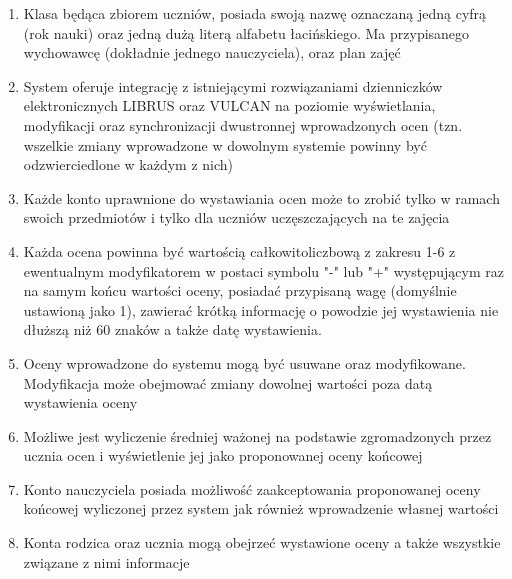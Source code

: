 \documentclass{article}
\begin{document}
\begin{enumerate}
    \item Klasa będąca zbiorem uczniów, posiada swoją nazwę oznaczaną jedną cyfrą (rok nauki) oraz jedną dużą literą alfabetu łacińskiego. Ma przypisanego wychowawcę (dokładnie jednego nauczyciela), oraz plan zajęć
    \item System oferuje integrację z istniejącymi rozwiązaniami dzienniczków elektronicznych LIBRUS oraz VULCAN na poziomie wyświetlania, modyfikacji oraz synchronizacji dwustronnej wprowadzonych ocen (tzn. wszelkie zmiany wprowadzone w dowolnym systemie powinny być odzwierciedlone w każdym z nich)
    \item Każde konto uprawnione do wystawiania ocen może to zrobić tylko w ramach swoich przedmiotów i tylko dla uczniów uczęszczających na te zajęcia
    \item Każda ocena powinna być wartością całkowitoliczbową z zakresu 1-6 z ewentualnym modyfikatorem w postaci symbolu "-" lub "+" występującym raz na samym końcu wartości oceny, posiadać przypisaną wagę (domyślnie ustawioną jako 1), zawierać krótką informację o powodzie jej wystawienia nie dłuższą niż 60 znaków a także datę wystawienia.
    \item Oceny wprowadzone do systemu mogą być usuwane oraz modyfikowane. Modyfikacja może obejmować zmiany dowolnej wartości poza datą wystawienia oceny
    \item Możliwe jest wyliczenie średniej ważonej na podstawie zgromadzonych przez ucznia ocen i wyświetlenie jej jako proponowanej oceny końcowej
    \item Konto nauczyciela posiada możliwość zaakceptowania proponowanej oceny końcowej wyliczonej przez system jak również wprowadzenie własnej wartości
    \item Konta rodzica oraz ucznia mogą obejrzeć wystawione oceny a także wszystkie związane z nimi informacje
\end{enumerate}
\end{document}
